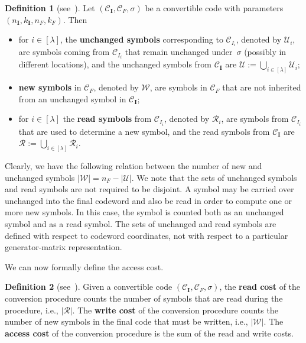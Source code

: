 \documentclass[conference, 10pt]{IEEEtran}
\theoremstyle{plain}
\theoremstyle{definition}
\newtheorem{definition}{Definition}
\newcommand{\mC}{\mathcal{C}}
\newcommand{\mU}{\mathcal{U}}
\newcommand{\mW}{\mathcal{W}}
\newcommand{\mR}{\mathcal{R}}
\begin{document}
\begin{definition}[\textnormal{see~\cite[Section III]{maturana2022convertible}}] \label{def:clasym}
Let $(\mC_\textbf{I},\mC_F,\sigma)$ be a convertible code with parameters $(n_\textbf{I},k_\textbf{I},n_F,k_F)$. Then 
\begin{itemize}
    \item[(i)] for $i \in [\lambda]$, the \textbf{unchanged symbols} corresponding to $\mC_{I_i}$, denoted by $\mU_{i}$, are symbols coming from $\mC_{I_i}$ that remain unchanged under~$\sigma$ (possibly in different locations), and the unchanged symbols from $\mC_{\textbf{I}}$ are $\mU := \bigcup_{i \in [\lambda]} \mU_i$;
    \item[(ii)]  \textbf{new symbols} in $\mC_F$, denoted by $\mW$, are symbols in $\mC_F$ that are not inherited from an unchanged symbol in $\mC_\textbf{I}$;
    \item[(iii)] for $i \in [\lambda]$ the \textbf{read symbols} from $\mC_{I_i}$, denoted by $\mR_{i}$, are symbols from $\mC_{I_i}$ that are used to determine a new symbol, and the read symbols from $\mC_{\textbf{I}}$ are $\mR := \bigcup_{i \in [\lambda]}\mR_i$.
    
    
   
\end{itemize}
Clearly, we have the following relation between the number of new and unchanged symbols $|\mW| = n_F - |\mU|$. We note that the sets of unchanged symbols and read symbols are not required to be disjoint. A symbol may be carried over unchanged into the final codeword and also be read in order to compute one or more new symbols. In this case, the symbol is counted both as an unchanged symbol and as a read symbol. The sets of unchanged and read symbols are defined with respect to codeword coordinates, not with respect to a particular generator-matrix representation.
\end{definition}


We can now formally define the access cost.
\begin{definition}[\textnormal{see~\cite[Definition 5]{maturana2022convertible}}]
Given a convertible code $(\mC_\textbf{I},\mC_F,\sigma)$, the \textbf{read cost} of the conversion procedure counts the number of symbols that are read during the procedure, i.e., $|\mR|$.
The \textbf{write cost} of the conversion procedure counts the number of new symbols in the final code that must be written, i.e., $|\mW|$.
The \textbf{access cost} of the conversion procedure is the sum of the read and write costs.
\end{definition}
\end{document}
